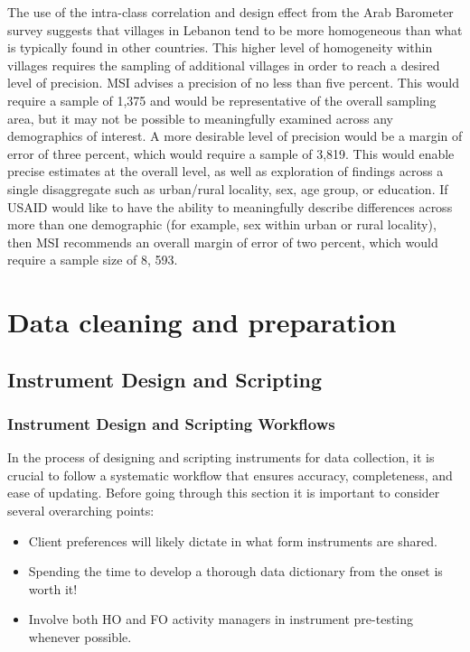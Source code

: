 \documentclass[
  letterpaper,
  DIV=11,
  numbers=noendperiod]{scrreprt}
\providecommand{\tightlist}{%
  \setlength{\itemsep}{0pt}\setlength{\parskip}{0pt}}\usepackage{longtable,booktabs,array}
\begin{document}
The use of the intra-class correlation and design effect from the Arab
Barometer survey suggests that villages in Lebanon tend to be more
homogeneous than what is typically found in other countries. This higher
level of homogeneity within villages requires the sampling of additional
villages in order to reach a desired level of precision. MSI advises a
precision of no less than five percent. This would require a sample of
1,375 and would be representative of the overall sampling area, but it
may not be possible to meaningfully examined across any demographics of
interest. A more desirable level of precision would be a margin of error
of three percent, which would require a sample of 3,819. This would
enable precise estimates at the overall level, as well as exploration of
findings across a single disaggregate such as urban/rural locality, sex,
age group, or education. If USAID would like to have the ability to
meaningfully describe differences across more than one demographic (for
example, sex within urban or rural locality), then MSI recommends an
overall margin of error of two percent, which would require a sample
size of 8, 593.

\chapter{Data cleaning and
preparation}\label{data-cleaning-and-preparation}

\section{Instrument Design and
Scripting}\label{instrument-design-and-scripting}

\subsection{Instrument Design and Scripting
Workflows}\label{instrument-design-and-scripting-workflows}

In the process of designing and scripting instruments for data
collection, it is crucial to follow a systematic workflow that ensures
accuracy, completeness, and ease of updating. Before going through this
section it is important to consider several overarching points:

\begin{itemize}
\tightlist
\item
  Client preferences will likely dictate in what form instruments are
  shared.
\item
  Spending the time to develop a thorough data dictionary from the onset
  is worth it!
\item
  Involve both HO and FO activity managers in instrument pre-testing
  whenever possible.
\end{itemize}
\end{document}
